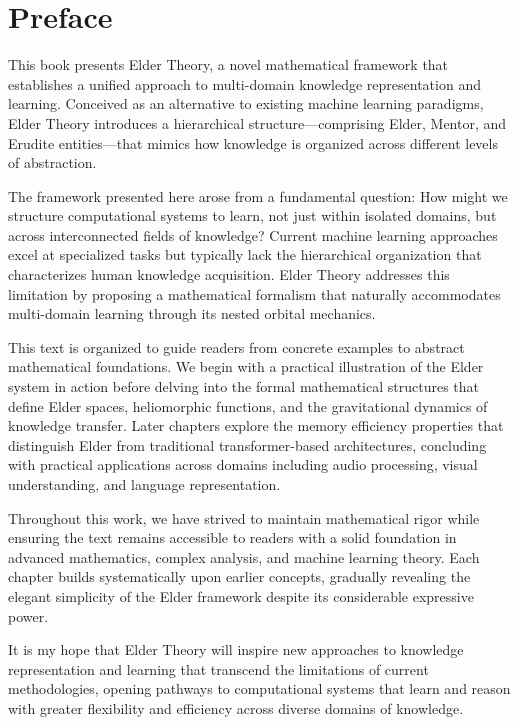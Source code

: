 \documentclass[11pt,twoside]{book}
\begin{document}
\chapter*{Preface}

This book presents Elder Theory, a novel mathematical framework that establishes a unified approach to multi-domain knowledge representation and learning. Conceived as an alternative to existing machine learning paradigms, Elder Theory introduces a hierarchical structure—comprising Elder, Mentor, and Erudite entities—that mimics how knowledge is organized across different levels of abstraction.

The framework presented here arose from a fundamental question: How might we structure computational systems to learn, not just within isolated domains, but across interconnected fields of knowledge? Current machine learning approaches excel at specialized tasks but typically lack the hierarchical organization that characterizes human knowledge acquisition. Elder Theory addresses this limitation by proposing a mathematical formalism that naturally accommodates multi-domain learning through its nested orbital mechanics.

This text is organized to guide readers from concrete examples to abstract mathematical foundations. We begin with a practical illustration of the Elder system in action before delving into the formal mathematical structures that define Elder spaces, heliomorphic functions, and the gravitational dynamics of knowledge transfer. Later chapters explore the memory efficiency properties that distinguish Elder from traditional transformer-based architectures, concluding with practical applications across domains including audio processing, visual understanding, and language representation.

Throughout this work, we have strived to maintain mathematical rigor while ensuring the text remains accessible to readers with a solid foundation in advanced mathematics, complex analysis, and machine learning theory. Each chapter builds systematically upon earlier concepts, gradually revealing the elegant simplicity of the Elder framework despite its considerable expressive power.

It is my hope that Elder Theory will inspire new approaches to knowledge representation and learning that transcend the limitations of current methodologies, opening pathways to computational systems that learn and reason with greater flexibility and efficiency across diverse domains of knowledge.
\end{document}
